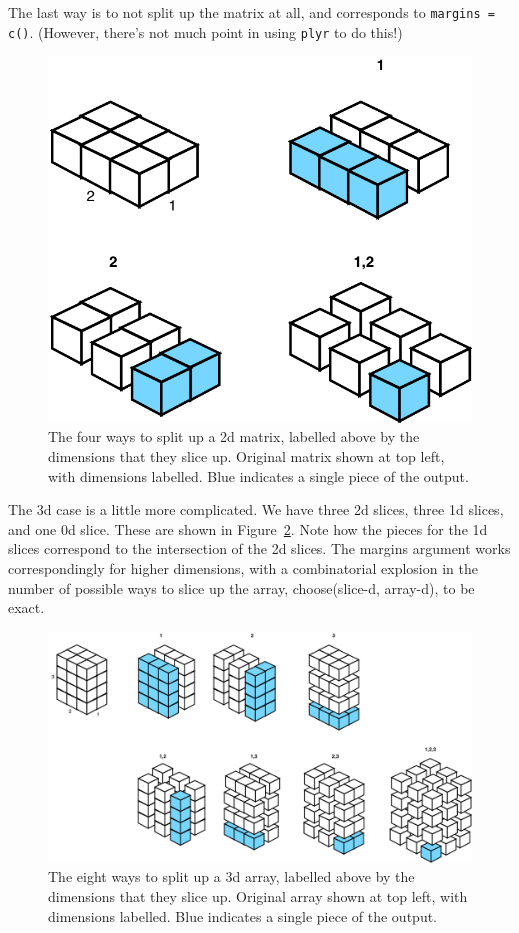 \documentclass{scrartcl}
\newcommand{\code}[1]{\lstinline!#1!}
\begin{document}
\noindent The last way is to not split up the matrix at all, and corresponds to \code{margins = c()}.  (However, there's not much point in using {\tt plyr} to do this!)

\begin{figure}[htbp]
  \centering
    \includegraphics[width= 0.35 \textwidth]{input-a2}
  \caption{The four ways to split up a 2d matrix, labelled above by the dimensions that they slice up.  Original matrix shown at top left, with dimensions labelled.  Blue indicates a single piece of the output.}
  \label{fig:split-matrix}
\end{figure}

The 3d case is a little more complicated.  We have three 2d slices, three 1d slices, and one 0d slice.  These are shown in Figure~\ref{fig:split-array}.  Note how the pieces for the 1d slices correspond to the intersection of the 2d slices.  The margins argument works correspondingly for higher dimensions, with a combinatorial explosion in the number of possible ways to slice up the array, choose(slice-d, array-d), to be exact.

\begin{figure}[htbp]
  \centering
    \includegraphics[width= \textwidth]{input-a3}
  \caption{The eight ways to split up a 3d array, labelled above by the dimensions that they slice up.  Original array shown at top left, with dimensions labelled.  Blue indicates a single piece of the output.}
  \label{fig:split-array}
\end{figure}
\end{document}
